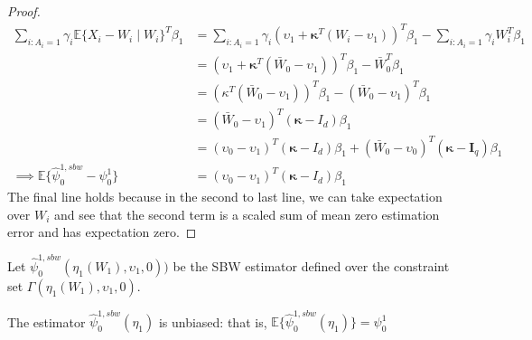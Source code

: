 \begin{proof}
\begin{align*}
    \sum_{i: A_i = 1} \gamma_i\mathbb{E}\{X_i - W_i \mid W_i\}^T\beta_1 &= \sum_{i: A_i = 1} \gamma_i (\upsilon_1 + \mathbf{\kappa}^T(W_i - \upsilon_1))^T\beta_1 - \sum_{i: A_i = 1}\gamma_i W_i^T\beta_1 \\
    &= (\upsilon_1 + \mathbf{\kappa}^T(\bar{W}_0 - \upsilon_1))^T\beta_1 - \bar{W}_0^T\beta_1 \\
    &= (\kappa^T(\bar{W}_0 - \upsilon_1))^T\beta_1 - (\bar{W}_0 - \upsilon_1)^T\beta_1  \\
    &= (\bar{W}_0 - \upsilon_1)^T(\mathbf{\kappa} - I_d)\beta_1 \\
    &= (\upsilon_0 - \upsilon_1)^T(\mathbf{\kappa} - I_d)\beta_1 + (\bar{W}_0 - \upsilon_0)^T(\mathbf{\kappa} - \mathbf{I}_q)\beta_1 \\
    \implies \mathbb{E}\{\hat{\psi}^{1, sbw}_0 - \psi^1_0\} &= (\upsilon_0 - \upsilon_1)^T(\mathbf{\kappa} - I_d)\beta_1
\end{align*}
%
The final line holds because in the second to last line, we can take expectation over $W_i$ and see that the second term is a scaled sum of mean zero estimation error and has expectation zero. 
\end{proof}

Let $\hat{\psi}^{1, sbw}_0(\eta_1(W_1), \upsilon_1, 0))$ be the SBW estimator defined over the constraint set $\Gamma(\eta_1(W_1), \upsilon_1, 0)$.

\begin{proposition}
The estimator $\hat{\psi}^{1, sbw}_0(\eta_1)$ is unbiased: that is,
$\mathbb{E}\{\hat{\psi}^{1, sbw}_0(\eta_1)\} = \psi_0^1$
\end{proposition}

